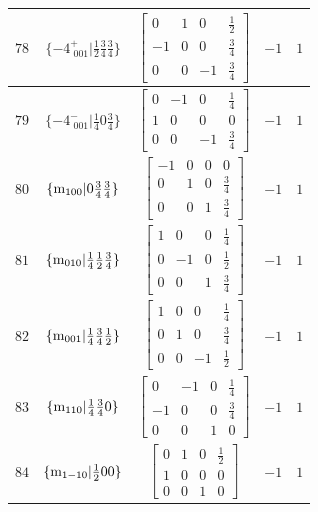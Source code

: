 \documentclass[fleqn,8pt]{jsarticle}
\begin{document}
\begin{longtable}{ccccc}
$ 78 $ & $ \{-4^{+}_{\,\,001}|\frac{1}{2} \frac{3}{4} \frac{3}{4}\} $ & $ \begin{bmatrix} 0 & 1 & 0 & \frac{1}{2} \\ -1 & 0 & 0 & \frac{3}{4} \\ 0 & 0 & -1 & \frac{3}{4} \end{bmatrix} $ & $ -1 $ & $ 1 $ \\ \hline
$ 79 $ & $ \{-4^{-}_{\,\,001}|\frac{1}{4} 0 \frac{3}{4}\} $ & $ \begin{bmatrix} 0 & -1 & 0 & \frac{1}{4} \\ 1 & 0 & 0 & 0 \\ 0 & 0 & -1 & \frac{3}{4} \end{bmatrix} $ & $ -1 $ & $ 1 $ \\ \hline
$ 80 $ & $ \{{\rm m}_{100}|0 \frac{3}{4} \frac{3}{4}\} $ & $ \begin{bmatrix} -1 & 0 & 0 & 0 \\ 0 & 1 & 0 & \frac{3}{4} \\ 0 & 0 & 1 & \frac{3}{4} \end{bmatrix} $ & $ -1 $ & $ 1 $ \\ \hline
$ 81 $ & $ \{{\rm m}_{010}|\frac{1}{4} \frac{1}{2} \frac{3}{4}\} $ & $ \begin{bmatrix} 1 & 0 & 0 & \frac{1}{4} \\ 0 & -1 & 0 & \frac{1}{2} \\ 0 & 0 & 1 & \frac{3}{4} \end{bmatrix} $ & $ -1 $ & $ 1 $ \\ \hline
$ 82 $ & $ \{{\rm m}_{001}|\frac{1}{4} \frac{3}{4} \frac{1}{2}\} $ & $ \begin{bmatrix} 1 & 0 & 0 & \frac{1}{4} \\ 0 & 1 & 0 & \frac{3}{4} \\ 0 & 0 & -1 & \frac{1}{2} \end{bmatrix} $ & $ -1 $ & $ 1 $ \\ \hline
$ 83 $ & $ \{{\rm m}_{110}|\frac{1}{4} \frac{3}{4} 0\} $ & $ \begin{bmatrix} 0 & -1 & 0 & \frac{1}{4} \\ -1 & 0 & 0 & \frac{3}{4} \\ 0 & 0 & 1 & 0 \end{bmatrix} $ & $ -1 $ & $ 1 $ \\ \hline
$ 84 $ & $ \{{\rm m}_{1-10}|\frac{1}{2} 0 0\} $ & $ \begin{bmatrix} 0 & 1 & 0 & \frac{1}{2} \\ 1 & 0 & 0 & 0 \\ 0 & 0 & 1 & 0 \end{bmatrix} $ & $ -1 $ & $ 1 $ \\ \hline

\end{longtable}
\end{document}
